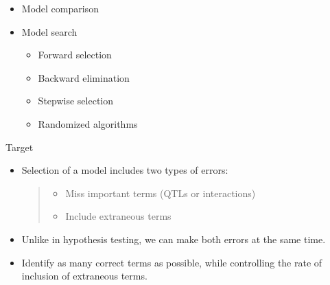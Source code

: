 \documentclass[12pt]{article}
\newcommand{\headsize}{\fontsize{35}{35} \selectfont}
\newcommand{\smallersize}{\fontsize{20}{25} \selectfont}
\newcommand{\smallestsize}{\fontsize{18}{22} \selectfont}
\begin{document}
\begin{minipage}[t]{4in}
\vspace*{0mm}

\begin{itemize}
\item Model comparison
{\smallestsize \color{myblue}  }

\vspace{15mm}


\item Model search
{\smallestsize \color{myblue} \begin{itemize}
\item Forward selection
\item Backward elimination
\item Stepwise selection
\item Randomized algorithms
\end{itemize} }


\end{itemize}

\end{minipage}


\newpage

\headsize \color{myyellow}
\hfill \begin{minipage}{5.75in}
\centering
Target
\end{minipage}

\vspace{2cm} \color{mywhite} \smallersize

\hfill \begin{minipage}{10in}
\begin{itemize}
\itemsep24pt
\item Selection of a model includes two types of errors:

{\smallestsize
\begin{quote} \begin{itemize}
\item Miss important terms (QTLs or interactions)
\item Include extraneous terms
\end{itemize} \end{quote}}

\item Unlike in hypothesis testing, we can make {\color{mypink} both errors} at
the same time.

\item {\color{myyellow} Identify as many correct terms as possible, while
{\color{mypink} controlling the rate of inclusion of extraneous terms}.}


\end{itemize}
\end{minipage}
\end{document}
